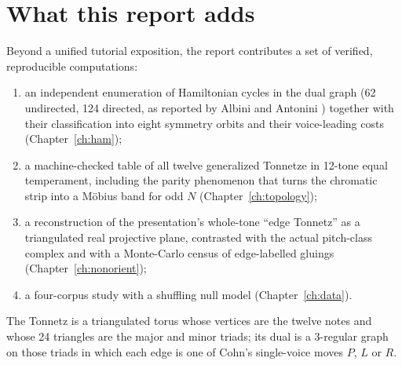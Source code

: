 \section{What this report adds}
Beyond a unified tutorial exposition, the report contributes a set of verified, reproducible computations:
\begin{enumerate}
\item an independent enumeration of Hamiltonian cycles in the dual graph (62 undirected, 124 directed, as reported
by Albini and Antonini \citep{albini2009}) together with their classification into eight symmetry orbits and their
voice-leading costs (Chapter~\ref{ch:ham});
\item a machine-checked table of all twelve generalized Tonnetze in 12-tone equal temperament, including the
parity phenomenon that turns the chromatic strip into a M\"obius band for odd $N$ (Chapter~\ref{ch:topology});
\item a reconstruction of the presentation's whole-tone ``edge Tonnetz'' as a triangulated real projective plane,
contrasted with the actual pitch-class complex and with a Monte-Carlo census of edge-labelled gluings
(Chapter~\ref{ch:nonorient});
\item a four-corpus study with a shuffling null model (Chapter~\ref{ch:data}).
\end{enumerate}

\begin{keybox}
The Tonnetz is a triangulated torus whose vertices are the twelve notes and whose 24 triangles are the major
and minor triads; its dual is a 3-regular graph on those triads in which each edge is one of Cohn's
single-voice moves $P$, $L$ or $R$.
\end{keybox}

